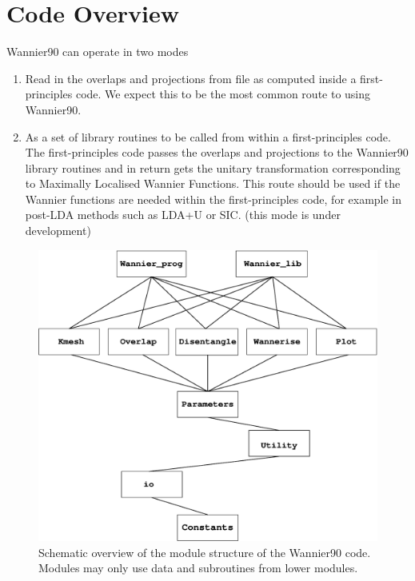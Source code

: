 \chapter{Code Overview}
Wannier90 can operate in two modes

\begin{enumerate}
\item Read in the overlaps and projections from file as computed 
inside a first-principles code. We expect this to be the most common route to using Wannier90.


\item As a set of library routines to be called from within a first-principles code. 
The first-principles code passes the overlaps and projections to the Wannier90 library routines
and in return gets the unitary transformation corresponding to Maximally Localised Wannier Functions.
This route should be used if the Wannier functions are needed within the first-principles code, for example
in post-LDA methods such as LDA+U or SIC. (this mode is under development)
\end{enumerate}


\begin{figure}
\begin{center}
\includegraphics[width=5in]{overview.eps}
\caption{Schematic overview of the module structure of the Wannier90 code. Modules may only use data
and subroutines from lower modules.}
\label{structure}
\end{center}
\end{figure}
